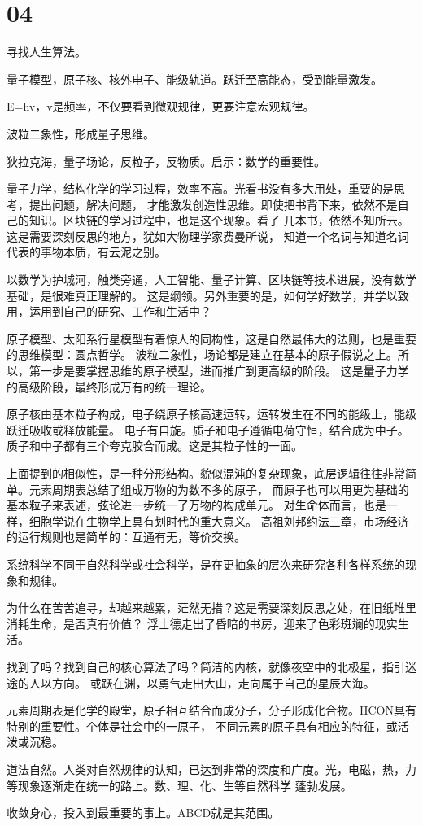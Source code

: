 \section{04}

寻找人生算法。

量子模型，原子核、核外电子、能级轨道。跃迁至高能态，受到能量激发。

E=hv，v是频率，不仅要看到微观规律，更要注意宏观规律。

波粒二象性，形成量子思维。

狄拉克海，量子场论，反粒子，反物质。启示：数学的重要性。

量子力学，结构化学的学习过程，效率不高。光看书没有多大用处，重要的是思考，提出问题，解决问题，
才能激发创造性思维。即使把书背下来，依然不是自己的知识。区块链的学习过程中，也是这个现象。看了
几本书，依然不知所云。这是需要深刻反思的地方，犹如大物理学家费曼所说，
知道一个名词与知道名词代表的事物本质，有云泥之别。

以数学为护城河，触类旁通，人工智能、量子计算、区块链等技术进展，没有数学基础，是很难真正理解的。
这是纲领。另外重要的是，如何学好数学，并学以致用，运用到自己的研究、工作和生活中？

原子模型、太阳系行星模型有着惊人的同构性，这是自然最伟大的法则，也是重要的思维模型：圆点哲学。
波粒二象性，场论都是建立在基本的原子假说之上。所以，第一步是要掌握思维的原子模型，进而推广到更高级的阶段。
这是量子力学的高级阶段，最终形成万有的统一理论。

原子核由基本粒子构成，电子绕原子核高速运转，运转发生在不同的能级上，能级跃迁吸收或释放能量。
电子有自旋。质子和电子遵循电荷守恒，结合成为中子。质子和中子都有三个夸克胶合而成。这是其粒子性的一面。

上面提到的相似性，是一种分形结构。貌似混沌的复杂现象，底层逻辑往往非常简单。元素周期表总结了组成万物的为数不多的原子，
而原子也可以用更为基础的基本粒子来表述，弦论进一步统一了万物的构成单元。
对生命体而言，也是一样，细胞学说在生物学上具有划时代的重大意义。
高祖刘邦约法三章，市场经济的运行规则也是简单的：互通有无，等价交换。

系统科学不同于自然科学或社会科学，是在更抽象的层次来研究各种各样系统的现象和规律。

为什么在苦苦追寻，却越来越累，茫然无措？这是需要深刻反思之处，在旧纸堆里消耗生命，是否真有价值？
浮士德走出了昏暗的书房，迎来了色彩斑斓的现实生活。

找到了吗？找到自己的核心算法了吗？简洁的内核，就像夜空中的北极星，指引迷途的人以方向。
或跃在渊，以勇气走出大山，走向属于自己的星辰大海。

元素周期表是化学的殿堂，原子相互结合而成分子，分子形成化合物。HCON具有特别的重要性。个体是社会中的一原子，
不同元素的原子具有相应的特征，或活泼或沉稳。

道法自然。人类对自然规律的认知，已达到非常的深度和广度。光，电磁，热，力等现象逐渐走在统一的路上。数、理、化、生等自然科学
蓬勃发展。

收敛身心，投入到最重要的事上。ABCD就是其范围。
